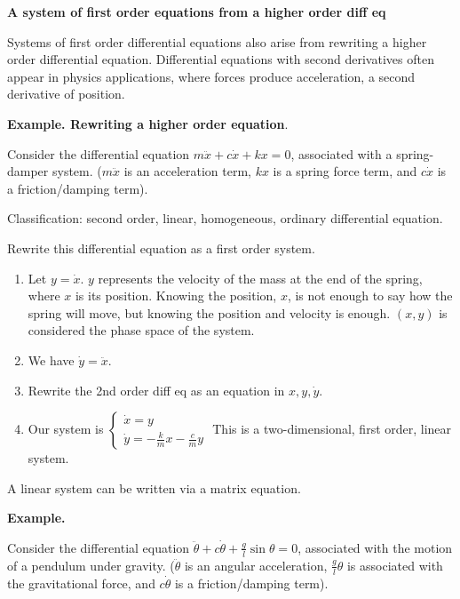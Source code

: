 \documentclass[12pt,letterpaper,noanswers]{exam}
\begin{document}
 \noindent\textbf{A system of first order equations from a higher order diff eq}
    \begin{tcolorbox}
Systems of first order differential equations also arise from rewriting a higher order differential equation.  Differential equations with second derivatives often appear in physics applications, where forces produce acceleration, a second derivative of position.
\end{tcolorbox}

\noindent\textbf{Example. Rewriting a higher order equation}.

Consider the differential equation $m\ddot x +c\dot x + k x = 0$, associated with a spring-damper system.  ($m\ddot x$ is an acceleration term, $kx$ is a spring force term, and $c\dot x$ is a friction/damping term).

Classification: second order, linear, homogeneous, ordinary differential equation.

Rewrite this differential equation as a first order system.

\begin{enumerate}
    \item Let $y = \dot x$.  $y$ represents the velocity of the mass at the end of the spring, where $x$ is its position.  Knowing the position, $x$, is not enough to say how the spring will move, but knowing the position and velocity is enough.  $(x,y)$ is considered the phase space of the system.
    \item We have $\dot y = \ddot x$.
    \item Rewrite the 2nd order diff eq as an equation in $x, y, \dot y$.
    \vspace{1in}
    \item Our system is $\left\{\begin{array}{l}\dot x = y \\
    \dot y = -\frac{k}{m}x - \frac{c}{m}y \end{array}\right.$
    This is a two-dimensional, first order, linear system.
\end{enumerate}

A linear system can be written via a matrix equation.
\vspace{1.5in}

\noindent\textbf{Example.}  

Consider the differential equation $\ddot \theta + c\dot\theta + \frac{g}{l}\sin\theta = 0$, associated with the motion of a pendulum under gravity.  ($\ddot\theta$ is an angular acceleration, $\frac{g}{l}\theta$ is associated with the gravitational force, and $c\dot\theta$ is a friction/damping term).
\end{document}
